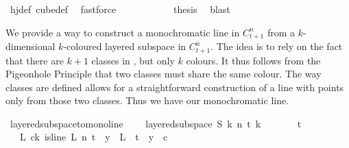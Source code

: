 \begin{isabellebody}
\ hj{\isacharunderscore}{\kern0pt}def\ cube{\isacharunderscore}{\kern0pt}def\ \isamarkupfalse%
\ fastforce\isanewline
\ \ \ \ \ \ \ \ \isamarkupfalse%
\ \isamarkupfalse%
\ {\isacharquery}{\kern0pt}thesis\ \isamarkupfalse%
\ blast\isanewline
\ \ \ \ \ \ \isamarkupfalse%
\isanewline
\isanewline
\ \ \ \ \isamarkupfalse%
\isanewline
\ \ \isamarkupfalse%
\isanewline
{}\isamarkupfalse%
%
\endisatagproof
{\isafoldproof}%
%
\isadelimproof
%
\endisadelimproof
%
\isadelimdocument
%
\endisadelimdocument
%
\isatagdocument
%
\isamarkuptrue%
%
\endisatagdocument
{\isafolddocument}%
%
\isadelimdocument
%
\endisadelimdocument
%
\begin{isamarkuptext}%
We provide a way to construct a monochromatic line in $C^n_{t + 1}$ from a $k$-dimensional $k$-coloured layered subspace  in $C^n_{t + 1}$.
The idea is to rely on the fact that there are $k+1$ classes in , but only $k$ colours. It thus follows from the Pigeonhole Principle that two classes must share the same colour. The way classes are defined allows for a straightforward construction of a line with points only from those two classes. Thus we have our monochromatic line.%
\end{isamarkuptext}\isamarkuptrue%
\isamarkupfalse%
\ layered{\isacharunderscore}{\kern0pt}subspace{\isacharunderscore}{\kern0pt}to{\isacharunderscore}{\kern0pt}mono{\isacharunderscore}{\kern0pt}line{\isacharcolon}{\kern0pt}\ \isanewline
\ \ \ {\isachardoublequoteopen}layered{\isacharunderscore}{\kern0pt}subspace\ S\ k\ n\ t\ k\ {\isasymchi}{\isachardoublequoteclose}\ \isanewline
\ \ \ \ \ {\isachardoublequoteopen}t\ {\isachargreater}{\kern0pt}\ {}{\isachardoublequoteclose}\ \ \isanewline
\ \ \ {\isachardoublequoteopen}{\isacharparenleft}{\kern0pt}{\isasymexists}L{\isachardot}{\kern0pt}\ {\isasymexists}c{\isacharless}{\kern0pt}k{\isachardot}{\kern0pt}\ is{\isacharunderscore}{\kern0pt}line\ L\ n\ {\isacharparenleft}{\kern0pt}t{\isacharplus}{\kern0pt}{}{\isacharparenright}{\kern0pt}\ {\isasymand}\ {\isacharparenleft}{\kern0pt}{\isasymforall}y\ {\isasymin}\ L\ {\isacharbackquote}{\kern0pt}\ {\isacharbraceleft}{\kern0pt}{\isachardot}{\kern0pt}{\isachardot}{\kern0pt}{\isacharless}{\kern0pt}t{\isacharplus}{\kern0pt}{}{\isacharbraceright}{\kern0pt}{\isachardot}{\kern0pt}\ {\isasymchi}\ y\ {\isacharequal}{\kern0pt}\ c{\isacharparenright}{\kern0pt}{\isacharparenright}{\kern0pt}{\isachardoublequoteclose}\isanewline

\end{isabellebody}
